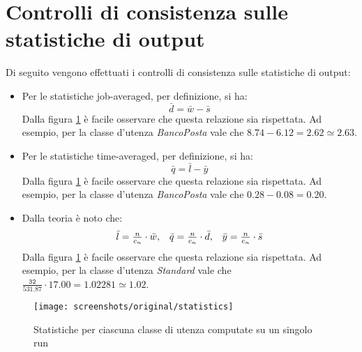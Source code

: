 \section{Controlli di consistenza sulle statistiche di output}
Di seguito vengono effettuati i controlli di consistenza sulle statistiche di output:
\begin{itemize}
\item Per le statistiche job-averaged, per definizione, si ha:
\begin{equation}
\bar{d} = \bar{w} - \bar{s}
\end{equation}
Dalla figura \ref{fig:verifica-2} è facile osservare che questa relazione sia rispettata. Ad esempio, per la classe d'utenza \uo{} \textsl{BancoPosta} vale che $\mathtt{8.74 - 6.12 = 2.62 \simeq 2.63}$.
\item Per le statistiche time-averaged, per definizione, si ha:
\begin{equation}
\bar{q} = \bar{l} - \bar{y}
\end{equation}
Dalla figura \ref{fig:verifica-2} è facile osservare che questa relazione sia rispettata. Ad esempio, per la classe d'utenza \uo{} \textsl{BancoPosta} vale che $\mathtt{0.28 - 0.08 = 0.20}$.
\item Dalla teoria è noto che:
\begin{equation}
\begin{array}{c c c}
\bar{l} = \frac{n}{c_n} \cdot \bar{w}, & \bar{q} = \frac{n}{c_n} \cdot \bar{d}, & \bar{y} = \frac{n}{c_n} \cdot \bar{s} 
\end{array}
\end{equation}
Dalla figura \ref{fig:verifica-2} è facile osservare che questa relazione sia rispettata. Ad esempio, per la classe d'utenza \pp{} \textsl{Standard} vale che $\mathtt{\frac{32}{531.87} \cdot 17.00 = 1.02281 \simeq 1.02}$.
\end{itemize}

\begin{figure}[ht]  
\centering 
\texttt{[image: screenshots/original/statistics]}
\caption{Statistiche per ciascuna classe di utenza computate su un singolo run}   
\label{fig:verifica-2}
\end{figure}

